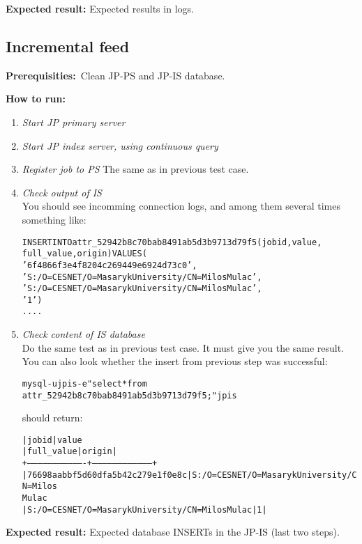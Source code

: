 \documentclass{egee}
\def\req{\noindent\textbf{Prerequisities:}}
\def\how{\noindent\textbf{How to run:}}
\def\result{\noindent\textbf{Expected result:}}
\begin{document}
\begin{enumerate}
\result{} Expected results in logs.


\subsection{Incremental feed}

\req\ Clean JP-PS and JP-IS database.

\how\
\begin{enumerate}
 \item \emph{Start JP primary server}
 \item \emph{Start JP index server, using continuous query}
 \item \emph{Register job to PS}
  The same as in previous test case.

 \item \emph{Check output of IS}\\
  You should see incomming connection logs, and among them
  several times something like:
  \begin{alltt}
    
   INSERT INTO attr_52942b8c70bab8491ab5d3b9713d79f5 (jobid, value,
                                        full_value, origin) VALUES (
     '6f4866f3e4f8204c269449e6924d73c0',
     'S:/O=CESNET/O=Masaryk University/CN=Milos Mulac',
     'S:/O=CESNET/O=Masaryk University/CN=Milos Mulac',
     '1')
   ....
  \end{alltt}
 \item \emph{Check content of IS database}\\
 Do the same test as in previous test case. It must give you the same
 result. You can also look whether the insert from previous step was 
 successful:
 \begin{alltt}
  mysql -u jpis -e "select * from
    attr_52942b8c70bab8491ab5d3b9713d79f5;" jpis
 \end{alltt}
  should return:
 \begin{alltt}
| jobid                            | value
| full_value                                      | origin |
+----------------------------------+-----------------------------------+
| 76698aabbf5d60dfa5b42c279e1f0e8c | S:/O=CESNET/O=Masaryk University/CN=Milos
Mulac 
| S:/O=CESNET/O=Masaryk University/CN=Milos Mulac |      1 |
 \end{alltt}
\end{enumerate}
\result{} Expected database INSERTs in the JP-IS (last two steps).


\end{enumerate}
\end{document}
